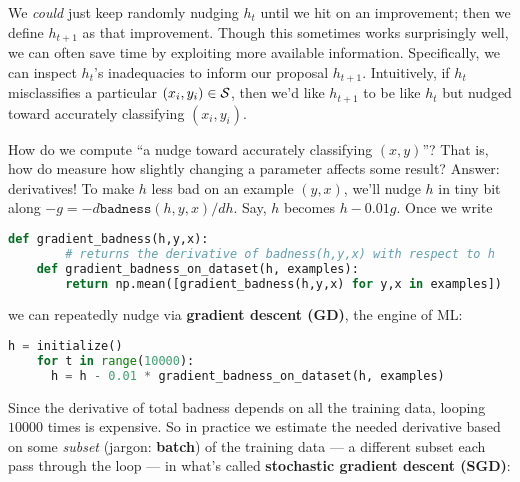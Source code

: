   We \emph{could} just keep randomly nudging $h_t$ until we hit on an
  improvement; then we define $h_{t+1}$ as that improvement.  Though this
  sometimes works surprisingly well, we can often save time by exploiting more available information.
  Specifically, we can inspect $h_t$'s inadequacies to inform our proposal
  $h_{t+1}$.
  Intuitively, if $h_t$ misclassifies a particular $(x_i, y_i) \in \mathcal{S}$, then
  we'd like $h_{t+1}$ to be like $h_t$ but nudged toward
  accurately classifying $(x_i, y_i)$.

  How do we compute ``{a nudge toward accurately classifying $(x, y)$}''?  That
  is, how do measure how slightly changing a parameter affects some result?
  Answer: derivatives!  To make $h$ less bad on an example $(y, x)$, we'll
  nudge $h$ in tiny bit along $-g = -d \texttt{badness}(h,y,x) /
  dh$. Say, $h$ becomes $h-0.01g$.
  Once we write
  \begin{lstlisting}[language=Python, basicstyle=\footnotesize\ttfamily]
    def gradient_badness(h,y,x):
        # returns the derivative of badness(h,y,x) with respect to h
    def gradient_badness_on_dataset(h, examples):
        return np.mean([gradient_badness(h,y,x) for y,x in examples])
  \end{lstlisting}
  we can repeatedly nudge via \textbf{gradient descent (GD)}, the engine of ML:
  \begin{lstlisting}[language=Python, basicstyle=\footnotesize\ttfamily]
    h = initialize()
    for t in range(10000):
      h = h - 0.01 * gradient_badness_on_dataset(h, examples)
  \end{lstlisting}
  Since the derivative of total badness depends on all the training data,
  looping $10000$ times is expensive.  So in practice we estimate the needed
  derivative based on some \emph{subset} (jargon: \textbf{batch}) of the
  training data --- a different subset each pass through the loop --- in what's
  called \textbf{stochastic gradient descent (SGD)}:
